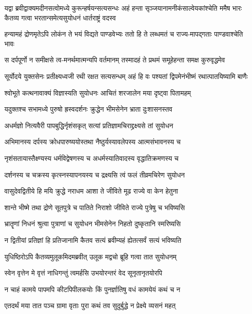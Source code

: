 \threelineshloka
{यद्वा ब्रवीद्वाक्यमदीनसत्वोमध्ये कुरून्हर्षयन्सत्यसन्धः}
{अहं हन्ता सृञ्जयानामनीकंसाल्वेयकांश्चेति ममैष भारः}
{कैतव्य गत्वा भरतान्समेत्यसुयोधनं धार्तराष्ट्रं वदस्व}


\twolineshloka
{हन्यामहं द्रोणमृतेऽपि लोकंन ते भयं विद्यते पाण्डवेभ्यः}
{ततो हि ते लब्धमतं च राज्य-मापद्गताः पाण्डवाश्चेति भावः}


\twolineshloka
{स दर्पपूर्णो न समीक्षसे त्व-मनर्थमात्मन्यपि वर्तमानम्}
{तस्मादहं ते प्रथमं समूहेहन्ता समक्ष कुरुवृद्धमेव}


\twolineshloka
{सूर्योदये युक्तसेनः प्रतीक्ष्यध्वजी रथी रक्षत सत्यसन्धम्}
{अहं हि वः पश्यतां द्विपमेनंभीष्मं रथात्पातयिष्यामि बाणैः}


\twolineshloka
{श्वोभूते कत्थनावाक्यं विज्ञास्यति सुयोधनः}
{आचितं शरजालेन मया दृष्ट्वा पितामहम्}


\twolineshloka
{यदुक्तश्च सभामध्ये पुरुषो ह्रस्वदर्शनः}
{क्रुद्धेन भीमसेनेन भ्राता दुःशासनस्तव}


\twolineshloka
{अधर्मज्ञो नित्यवैरी पापबुद्धिर्नृशंसकृत्}
{सत्यां प्रतिज्ञामचिराद्द्रक्ष्यसे तां सुयोधन}


\twolineshloka
{अभिमानस्य दर्पस्य क्रोधपारुष्ययोस्तथा}
{नैष्ठुर्यस्यावलेपस्य आत्मसंभावनस्य च}


\twolineshloka
{नृशंसतायास्तैक्ष्ण्यस्य धर्मविद्वेषणस्य च}
{अधर्मस्यातिवादस्य वृद्धातिक्रमणस्य च}


\twolineshloka
{दर्शनस्य च चक्रस्य कृत्स्नस्यापनयस्य च}
{द्रक्ष्यसि त्वं फलं तीव्रमचिरेण सुयोधन}


\twolineshloka
{वासुदेवद्वितीये हि मयि क्रुद्धे नराधम}
{आशा ते जीविते मूढ राज्ये वा केन हेतुना}


\twolineshloka
{शान्ते भीष्मे तथा द्रोणे सूतपुत्रे च पातिते}
{निराशो जीविते राज्ये पुत्रेषु च भविष्यसि}


\twolineshloka
{भ्रातॄणां निधनं श्रुत्वा पुत्राणां च सुयोधन}
{भीमसेनेन निहतो दुष्कृतानि स्मरिष्यसि}


\twolineshloka
{न द्वितीयां प्रतिज्ञां हि प्रतिजानामि कैतव}
{सत्यं ब्रवीम्यहं ह्येतत्सर्वं सत्यं भविष्यति}


\twolineshloka
{युधिष्ठिरोऽपि कैतव्यमुलूकमिदमब्रवीत्}
{उलूक मद्वचो ब्रूहि गत्वा तात सुयोधनम्}


\twolineshloka
{स्वेन वृत्तेन मे वृत्तं नाधिगन्तुं त्वमर्हसि}
{उभयोरन्तरं वेद सूनृतानृतयोरपि}


\twolineshloka
{न चाहं कामये पापमपि कीटपिपीलकयोः}
{किं पुनर्ज्ञातिषु वधं कामयेयं कथं च न}


\twolineshloka
{एतदर्थं मया तात पञ्च ग्रामा वृताः पुरा}
{कथं तव सुदुर्बुद्धे न प्रेक्ष्ये व्यसनं महत्}


